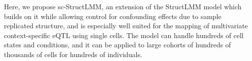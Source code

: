 
Here, we propose sc-StructLMM, an extension of the StructLMM model which builds on it while allowing control for confounding effects due to sample replicated structure, and is especially well suited for the mapping of multivariate context-specific eQTL using single cells. 
The model can handle hundreds of cell states and conditions, and it can be applied to large cohorts of hundreds of thousands of cells for hundreds of  individuals.



